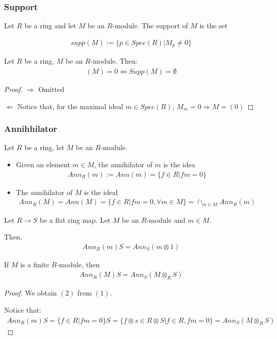 \documentclass[Total.tex]{subfiles}
\begin{document}
			\subsubsection{Support}
			\begin{Def}
				Let $R$ be a ring and let $M$ be an $R$-module. The support of $M$ is the set
				
				\begin{gather*}
					supp(M):=\{p\in Spec(R)|M_p\not=0\}
				\end{gather*}
			\end{Def}
			\begin{lemma}
				Let $R$ be a ring, $M$ be an $R$-module. Then:
				\begin{gather*}
					(M)=0\Leftrightarrow Supp(M)=\emptyset
				\end{gather*}
			\end{lemma}
			\begin{proof}
				$\Rightarrow$ Omitted
				
				$\Leftarrow$ Notice that, for the maximal ideal $m\in Spec(R)$, $M_m=0\Rightarrow M=(0)$
			\end{proof}
			\subsubsection{Annihhilator}
			\begin{Def}
				Let $R$ be a ring, let $M$ be an $R$-module.
				\begin{itemize}
					\item Given an element $m\in M$, the annihilator of $m$ is the idea
					\begin{gather*}
						Ann_R (m):=Ann(m)=\{f\in R|fm=0\}
					\end{gather*}
					\item The annihilator of $M$ is the ideal
					\begin{gather*}
						Ann_R(M)=Ann(M)=\{f\in R|fm=0,\forall m\in M\}=\cap_{m\in M} Ann_R(m)
					\end{gather*}
				\end{itemize}
			\end{Def}
			
			\begin{lemma}
				Let $R\rightarrow S$ be a flat ring map. Let $M$ be an $R$-module and $m\in M$.
				
				Then, 
				\begin{gather*}
					Ann_R(m)S=Ann_S(m\otimes 1)
				\end{gather*}
				
				If $M$ is a finite $R$-module, then
				\begin{gather*}
					Ann_R(M)S=Ann_S(M\otimes_R S)
				\end{gather*}
			\end{lemma}
			\begin{proof}
				We obtain $(2)$ from $(1)$.
				
				Notice that:
				\begin{gather*}
					Ann_R(m)S=\{f\in R|fm=0\}S=\{f\otimes s\in R\otimes S|f\in R,fm=0\}=Ann_S(M\otimes_R S)
				\end{gather*}
			\end{proof}
			
\end{document}
